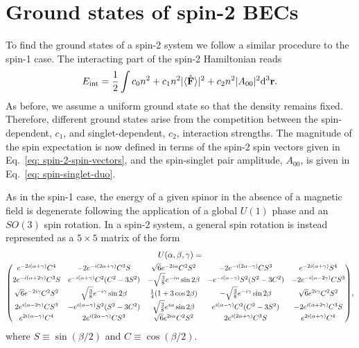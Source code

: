 \section{Ground states of spin-2 BECs}\label{sec: ground-states-spin-2}
To find the ground states of a spin-2 system we follow a similar procedure to
the spin-1 case.
The interacting part of the spin-2 Hamiltonian reads
\begin{align}
    E_\mathrm{int} = \frac{1}{2}\int c_0n^2 + c_1n^2|\langle \hat{\vb{F}} \rangle |^2+c_2n^2|A_{00}|^2
    \dd^3\vb{r}.
\end{align}
As before, we assume a uniform ground state so that the density remains fixed.
Therefore, different ground states arise from the competition between the
spin-dependent, \(c_1\), and singlet-dependent, \(c_2\), interaction strengths.
The magnitude of the spin expectation is now defined in terms of the spin-2
spin vectors given in Eq.~\eqref{eq: spin-2-spin-vectors}, and the spin-singlet
pair amplitude, \(A_{00}\), is given in Eq.~\eqref{eq: spin-singlet-duo}.

As in the spin-1 case, the energy of a given spinor in the absence of a magnetic
field is degenerate following the application of a global \(U(1)\) phase and an
\(SO(3)\) spin rotation.
In a spin-2 system, a general spin rotation is instead represented as a
\(5\times 5\) matrix of the form~\cite{Kawaguchi2012}
\begin{multline}\label{eq: spin-2-rotation-matrix}
    U(\alpha, \beta, \gamma) = \\
    \scalemath{0.90}{\mqty(
    e^{-2i(\alpha + \gamma)}C^4 & -2e^{-i(2\alpha+\gamma)}C^3S
    & \sqrt{6}e^{-2i\alpha}C^2S^2 & -2e^{-i(2\alpha-\gamma)}CS^3
    & e^{-2i(\alpha + \gamma)}S^4
    \\
    2e^{-i(\alpha+2\gamma)}C^3S & e^{-i(\alpha+\gamma)}C^2(C^2-3S^2)
    & -\sqrt{\frac{3}{8}}e^{-i\alpha}\sin 2\beta
    & -e^{-i(\alpha-\gamma)}S^2(S^2-3C^2) & -2e^{-i(\alpha-2\gamma)}CS^3
    \\
    \sqrt{6}e^{-2i\gamma}C^2S^2 & \sqrt{\frac{3}{8}}e^{-i\gamma}\sin 2\beta
    & \frac{1}{4}(1+3\cos 2\beta)
    & -\sqrt{\frac{3}{8}}e^{-i\gamma}\sin 2\beta
    & \sqrt{6}e^{2i\gamma}C^2S^2
    \\
    2e^{i(\alpha-2\gamma)}CS^3 & -e^{i(\alpha-\gamma)}S^2(S^2-3C^2)
    & \sqrt{\frac{3}{8}}e^{i\alpha}\sin 2\beta
    & e^{i(\alpha-\gamma)}C^2(C^2-3S^2) & -2e^{i(\alpha+2\gamma)}C^3S
    \\
    e^{2i(\alpha - \gamma)}C^4 & 2e^{i(2\alpha-\gamma)}CS^3
    & \sqrt{6}e^{2i\alpha}C^2S^2 & 2e^{i(2\alpha+\gamma)}C^3S
    & e^{2i(\alpha + \gamma)}C^4
    )},
\end{multline}
where \(S \equiv \sin(\beta/2)\) and \(C \equiv \cos(\beta/2)\).

